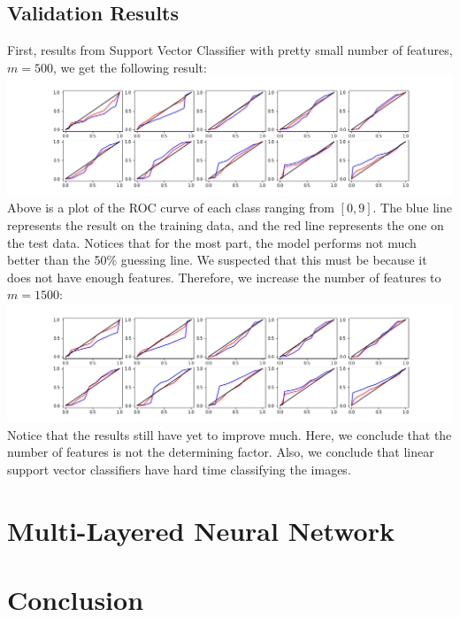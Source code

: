 \documentclass[12pt, a4paper]{article}
\begin{document}
		\subsection{Validation Results}
			First, results from Support Vector Classifier with pretty small number of features, $m=500$, we get the following result:
			\centering\includegraphics[width=7in]{../figures/roc_curve_pca500.png}\\
			Above is a plot of the ROC curve of each class ranging from $[0,9]$. The blue line represents the result on the training data, and the red line represents the one on the test data. Notices that for the most part, the model performs not much better than the 50\% guessing line. We suspected that this must be because it does not have enough features. Therefore, we increase the number of features to $m=1500$:
			\centering\includegraphics[width=7in]{../figures/roc_curve_pca1500.png}\\			
			Notice that the results still have yet to improve much. Here, we conclude that the number of features is not the determining factor. Also, we conclude that linear support vector classifiers have hard time classifying the images.
	\section{Multi-Layered Neural Network}
	\section{Conclusion}
\end{document}
